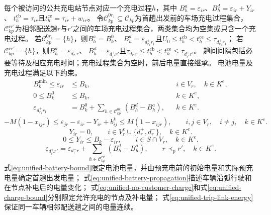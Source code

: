 \documentclass{setp-new}
\begin{document}
每个被访问的公共充电站节点对应一个充电过程$h$，其中
$B_h^{a}=\varepsilon_{ir}$、$B_h^{d}=\varepsilon_{ir}+Y_{ir}$、
$t_h^{\mathrm{cb}}=\tau_{ir}$且$t_h^{\mathrm{ce}}=\tau_{ir}+w_{ir}$。
令$\mathcal C_{kp}^{0r_1}\subseteq\mathcal C_{kp}$为首趟出发前的车场充电过程集合，
$\mathcal C_{kp}^{rr'}$为相邻配送趟$r$与$r'$之间的车场充电过程集合，两类集合均为空集或只含一个充电过程。
若$\mathcal C_{kp}^{0r_1}=\{h\}$，则$B_h^{a}=B_k^{0}$、
$B_h^{d}=\varepsilon_{d_{r_1}^{+}r_1}$且$U_0\le t_h^{\mathrm{cb}}<t_h^{\mathrm{ce}}\le\tau_{d_{r_1}^{+}r_1}$；
若$\mathcal C_{kp}^{rr'}=\{h\}$，则$B_h^{a}=\varepsilon_{d_r^{-}r}$、
$B_h^{d}=\varepsilon_{d_{r'}^{+}r'}$且$\tau_{d_r^{-}r}\le t_h^{\mathrm{cb}}<t_h^{\mathrm{ce}}\le\tau_{d_{r'}^{+}r'}$。
趟间间隔包括必要等待及相应充电时间；充电过程集合为空时，前后电量直接继承\cite{ref:12}。
电池电量及充电过程满足以下约束。
\begin{equation}
\begin{aligned}
B_k^{\min}\le\varepsilon_{ir}&\le B_k,
&&i\in V_r,\quad k\in K^{e},\\
0\le B_k^{0}&\le B_k,
&&k\in K^{e},\\
\varepsilon_{d_{r_1}^{+}r_1}
&=B_k^{0}+\sum_{h\in\mathcal C_{kp}^{0r_1}}(B_h^{d}-B_h^{a}),
&&k\in K^{e}.
\end{aligned}
\label{eq:unified-battery-bound}
\end{equation}
\begin{equation}
-M(1-x_{ijr})
\le\varepsilon_{jr}-\varepsilon_{ir}-Y_{ir}+b_{ij}^{k}
\le M(1-x_{ijr}),
\qquad i,j\in V_r,\quad i\ne j,\quad k\in K^{e}.
\label{eq:unified-battery-propagation}
\end{equation}
\begin{equation}
Y_{ir}=0,
\qquad i\in V_r^{c}\cup\{d_r^{+},d_r^{-}\},\quad k\in K^{e}.
\label{eq:unified-no-customer-charge}
\end{equation}
\begin{equation}
0\le Y_{ir}\le B_k-\varepsilon_{ir},
\qquad i\in S\cap V_r,\quad k\in K^{e}.
\label{eq:unified-charge-bound}
\end{equation}
\begin{equation}
\varepsilon_{d_{r'}^{+}r'}
=\varepsilon_{d_r^{-}r}
+\sum_{h\in\mathcal C_{kp}^{rr'}}(B_h^{d}-B_h^{a}),
\qquad r\prec_p r',\quad k\in K^{e}.
\label{eq:unified-trip-link-energy}
\end{equation}
式\eqref{eq:unified-battery-bound}限定电池电量，并由预充电前的初始电量和实际预充电量确定首趟出发电量；
式\eqref{eq:unified-battery-propagation}描述车辆沿弧行驶和在节点补电后的电量变化；
式\eqref{eq:unified-no-customer-charge}和式\eqref{eq:unified-charge-bound}分别限定允许充电的节点及补电量；
式\eqref{eq:unified-trip-link-energy}保证同一车辆相邻配送趟之间的电量连续。
\end{document}
